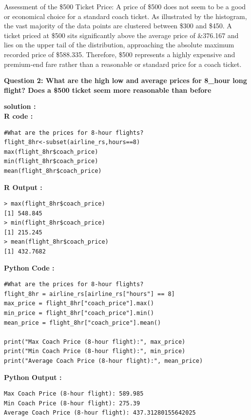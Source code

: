 \documentclass[11pt,a4paper]{article}
\begin{document}
Assessment of the \$500 Ticket Price: A price of \$500 does not seem to be a good or economical choice for a standard coach ticket. As illustrated by the histogram, the vast majority of the data points are clustered between \$300 and \$450. A ticket priced at \$500 sits significantly above the average price of \&376.167 and lies on the upper tail of the distribution, approaching the absolute maximum recorded price of \$588.335. Therefore, \$500 represents a highly expensive and premium-end fare rather than a reasonable or standard price for a coach ticket.
\vspace{2.5em}


\noindent \textbf{\large Question 2:
What are the high low and average prices for 8\_hour long flight? Does a \$500 ticket seem more reasonable than before}

\vspace{1em}
\noindent \textbf{solution :}\\
\noindent\textbf{R code :}
\begin{codebox}
\begin{lstlisting}[style=Rstyle]
#What are the prices for 8-hour flights?
flight_8hr<-subset(airline_rs,hours==8)
max(flight_8hr$coach_price)
min(flight_8hr$coach_price)
mean(flight_8hr$coach_price)
\end{lstlisting}
\end{codebox}
\vspace{0.5em}
\noindent \textbf{R Output :}
\begin{verbatim}
> max(flight_8hr$coach_price)
[1] 548.845
> min(flight_8hr$coach_price)
[1] 215.245
> mean(flight_8hr$coach_price)
[1] 432.7682
\end{verbatim}
\vspace{0.5em}
\noindent \textbf{Python Code :}
\begin{codebox}
\begin{lstlisting}[style=Pythonstyle]
#What are the prices for 8-hour flights?
flight_8hr = airline_rs[airline_rs["hours"] == 8]
max_price = flight_8hr["coach_price"].max()
min_price = flight_8hr["coach_price"].min()
mean_price = flight_8hr["coach_price"].mean()

print("Max Coach Price (8-hour flight):", max_price)
print("Min Coach Price (8-hour flight):", min_price)
print("Average Coach Price (8-hour flight):", mean_price)
\end{lstlisting}
\end{codebox}
\vspace{0.5em}
\noindent \textbf{Python Output :}
\begin{verbatim}
Max Coach Price (8-hour flight): 589.985
Min Coach Price (8-hour flight): 275.39
Average Coach Price (8-hour flight): 437.31280155642025
\end{verbatim}
\vspace{0.5em}
\end{document}
